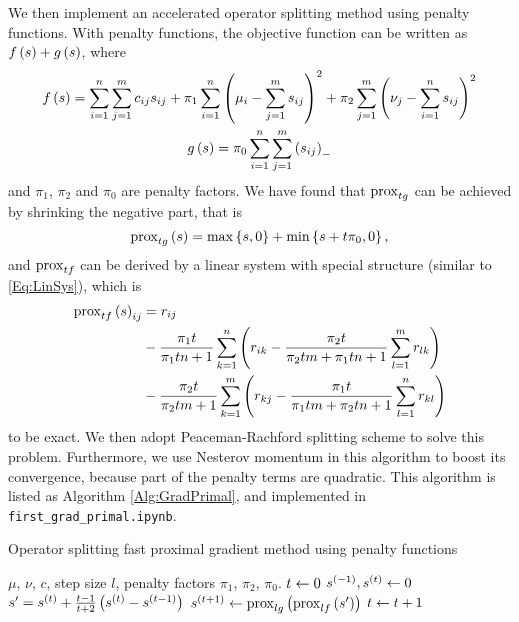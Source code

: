 \documentclass[english]{pkupaper}
\begin{document}
We then implement an accelerated operator splitting method using penalty functions. With penalty functions, the objective function can be written as $ f \left( s \right) + g \left( s \right) $, where
\begin{gather}
f \left( s \right) = \sum_{ {i} = {1} }^{n}{\sum_{ {j} = {1} }^{m}{ c_{ i j } s_{ i j } }} + \pi_1 \sum_{ {i} = {1} }^{n}{\left(  \mu_i - \sum_{ {j} = {1} }^{m}{s_{ i j }}  \right)^2} + \pi_2 \sum_{ {j} = {1} }^{m}{\left(  \nu_j - \sum_{ {i} = {1} }^{n}{s_{ i j }}  \right)^2} \\
g \left( s \right) = \pi_0 \sum_{ {i} = {1} }^{n}{\sum_{ {j} = {1} }^{m}{\left( s_{ i j } \right)_-}}
\end{gather}
and $\pi_1$, $\pi_2$ and $\pi_0$ are penalty factors.
We have found that $ \operatorname{\mathrm{prox}}_{ t g } $ can be achieved by shrinking the negative part, that is
\begin{equation}
\operatorname{\mathrm{prox}}_{ t g } \left( s \right) = \max \left\{  s, 0  \right\} + \min \left\{  s + t \pi_0, 0  \right\},
\end{equation}
and $ \operatorname{\mathrm{prox}}_{ t f } $ can be derived by  a linear system with special structure (similar to \eqref{Eq:LinSys}), which is
\begin{equation}
\begin{split}
\operatorname{\mathrm{prox}}_{ t f } \left( s \right)_{ i j } &= r_{ i j } \\
&- \frac{ \pi_1 t }{ \pi_1 t n + 1 } \sum_{ {k} = {1} }^{n}{\left(  r_{ i k } - \frac{ \pi_2 t }{ \pi_2 t m + \pi_1 t n + 1 } \sum_{ {l} = {1} }^{m}{r_{ l k }}  \right)} \\
&- \frac{ \pi_2 t }{ \pi_2 t m + 1 } \sum_{ {k} = {1} }^{m}{\left(  r_{ k j } - \frac{ \pi_1 t }{ \pi_1 t m + \pi_2 t n + 1 } \sum_{ {l} = {1} }^{n}{r_{ k l }}  \right)}
\end{split}
\end{equation}
to be exact. We then adopt Peaceman-Rachford splitting scheme to solve this problem. Furthermore, we use Nesterov momentum in this algorithm to boost its convergence, because part of the penalty terms are quadratic. This algorithm is listed as Algorithm \ref{Alg:GradPrimal}, and implemented in \verb"first_grad_primal.ipynb".

\begin{algorithm}
\caption{Operator splitting fast proximal gradient method using penalty functions}
\label{Alg:GradPrimal}
\begin{algorithmic}
\REQUIRE $\mu$, $\nu$, $c$, step size $l$, penalty factors $\pi_1$, $\pi_2$, $\pi_0$.
\STATE $ t \leftarrow 0 $
\STATE $ s^{\left( -1 \right)}, s^{\left( t \right)} \leftarrow 0 $
\STATE $ s' = s^{\left( t \right)} + \frac{ t - 1 }{ t + 2 } \left(  s^{\left( t \right)} - s^{\left(  t - 1  \right)}  \right) $
\STATE $ s^{\left(  t + 1  \right)} \leftarrow \operatorname{\mathrm{prox}}_{ l g } \left(  \operatorname{\mathrm{prox}}_{ l f } \left( s' \right)  \right) $
\STATE $ t \leftarrow t + 1 $
\ENDWHILE
\end{algorithmic}
\end{algorithm}
\end{document}
